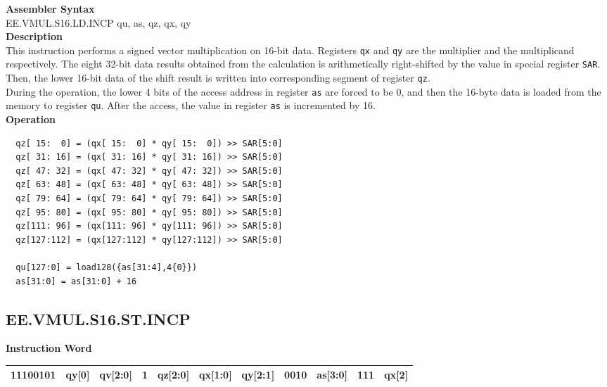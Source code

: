 \textbf{Assembler Syntax} \\
EE.VMUL.S16.LD.INCP qu, as, qz, qx, qy \\
\textbf{Description} \\
This instruction performs a signed vector multiplication on 16-bit data. Registers \lstinline{qx} and \lstinline{qy} are the multiplier and the multiplicand respectively. The eight 32-bit data results obtained from the calculation is arithmetically right-shifted by the value in special register \lstinline{SAR}. Then, the lower 16-bit data of the shift result is written into corresponding segment of register \lstinline{qz}. \\ During the operation, the lower 4 bits of the access address in register \lstinline{as} are forced to be 0, and then the 16-byte data is loaded from the memory to register \lstinline{qu}. After the access, the value in register \lstinline{as} is incremented by 16.\\
\textbf{Operation}
\begin{lstlisting}
  qz[ 15:  0] = (qx[ 15:  0] * qy[ 15:  0]) >> SAR[5:0]
  qz[ 31: 16] = (qx[ 31: 16] * qy[ 31: 16]) >> SAR[5:0]
  qz[ 47: 32] = (qx[ 47: 32] * qy[ 47: 32]) >> SAR[5:0]
  qz[ 63: 48] = (qx[ 63: 48] * qy[ 63: 48]) >> SAR[5:0]
  qz[ 79: 64] = (qx[ 79: 64] * qy[ 79: 64]) >> SAR[5:0]
  qz[ 95: 80] = (qx[ 95: 80] * qy[ 95: 80]) >> SAR[5:0]
  qz[111: 96] = (qx[111: 96] * qy[111: 96]) >> SAR[5:0]
  qz[127:112] = (qx[127:112] * qy[127:112]) >> SAR[5:0]

  qu[127:0] = load128({as[31:4],4{0}})
  as[31:0] = as[31:0] + 16
\end{lstlisting}

\clearpage
\subsection{EE.VMUL.S16.ST.INCP}\label{instruction:EEVMULS16STINCP}
\setlength\tabcolsep{6pt}
\textbf{Instruction Word} \\
\begin{tabular}{|c|c|c|c|c|c|c|c|c|c|c|}
	\hline
	11100101 & qy[0] & qv[2:0] & 1 & qz[2:0] & qx[1:0] & qy[2:1] & 0010 & as[3:0] & 111 & qx[2] \\
	\hline
\end{tabular}


